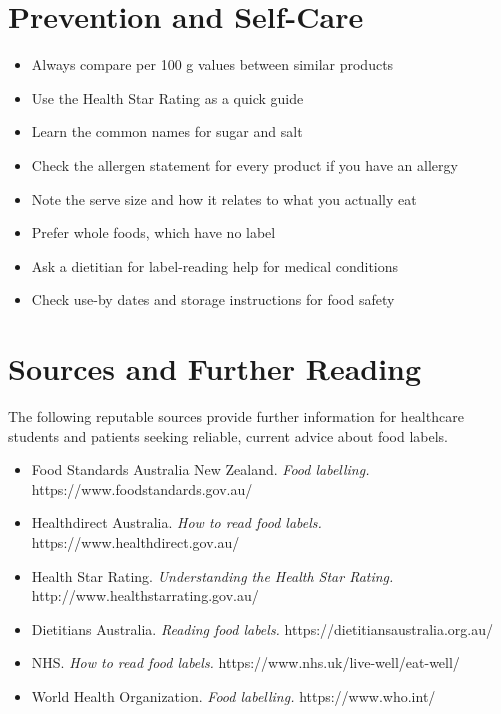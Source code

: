\section*{Prevention and Self-Care}
\begin{itemize}
    \item Always compare per 100 g values between similar products
    \item Use the Health Star Rating as a quick guide
    \item Learn the common names for sugar and salt
    \item Check the allergen statement for every product if you have an allergy
    \item Note the serve size and how it relates to what you actually eat
    \item Prefer whole foods, which have no label
    \item Ask a dietitian for label-reading help for medical conditions
    \item Check use-by dates and storage instructions for food safety
\end{itemize}

\section*{Sources and Further Reading}
The following reputable sources provide further information for healthcare students and patients seeking reliable, current advice about food labels.
\begin{itemize}
    \item Food Standards Australia New Zealand. \textit{Food labelling.} https://www.foodstandards.gov.au/
    \item Healthdirect Australia. \textit{How to read food labels.} https://www.healthdirect.gov.au/
    \item Health Star Rating. \textit{Understanding the Health Star Rating.} http://www.healthstarrating.gov.au/
    \item Dietitians Australia. \textit{Reading food labels.} https://dietitiansaustralia.org.au/
    \item NHS. \textit{How to read food labels.} https://www.nhs.uk/live-well/eat-well/
    \item World Health Organization. \textit{Food labelling.} https://www.who.int/
\end{itemize}
